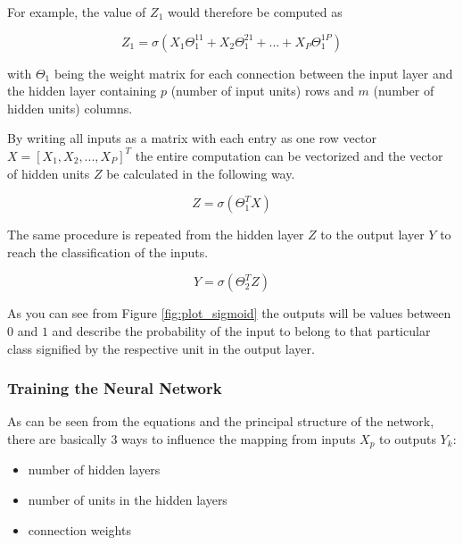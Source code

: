 For example, the value of $Z_1$ would therefore be computed as

\begin{equation}
    Z_1 = \sigma(X_1\Theta_1^{11} + X_2\Theta_1^{21} + ... + X_P\Theta_1^{1P})
\end{equation}

with $\Theta_1$ being the weight matrix for each connection between the input layer and the hidden layer containing $p$ (number of input units) rows and $m$ (number of hidden units) columns.

By writing all inputs as a matrix with each entry as one row vector $X = [X_1, X_2, ..., X_P]^T$ the entire computation can be vectorized and the vector of hidden units $Z$ be calculated in the following way. 

\begin{equation}
    Z = \sigma(\Theta_1^TX)
\end{equation}

The same procedure is repeated from the hidden layer $Z$ to the output layer 
$Y$ to reach the classification of the inputs.

\begin{equation}
    Y = \sigma(\Theta_2^TZ)
\end{equation}

As you can see from Figure \ref{fig:plot_sigmoid} the outputs will be values between $0$ and $1$ and describe the probability of the input to belong to that particular class signified by the respective unit in the output layer.


\subsubsection{Training the Neural Network}

As can be seen from the equations and the principal structure of the network, there are basically 3 ways to influence the mapping from inputs $X_p$ to outputs $Y_k$:

\begin{itemize}
    \item number of hidden layers
    \item number of units in the hidden layers
    \item connection weights
\end{itemize}

